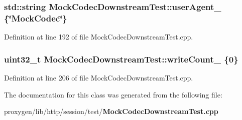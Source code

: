 \subsubsection[{user\+Agent\+\_\+}]{\setlength{\rightskip}{0pt plus 5cm}std\+::string Mock\+Codec\+Downstream\+Test\+::user\+Agent\+\_\+ \{\char`\"{}Mock\+Codec\char`\"{}\}\hspace{0.3cm}{\ttfamily [protected]}}\label{classMockCodecDownstreamTest_a39a7c662122701a53ba0e01bfd8dbeb9}


Definition at line 192 of file Mock\+Codec\+Downstream\+Test.\+cpp.

\subsubsection[{write\+Count\+\_\+}]{\setlength{\rightskip}{0pt plus 5cm}uint32\+\_\+t Mock\+Codec\+Downstream\+Test\+::write\+Count\+\_\+ \{0\}\hspace{0.3cm}{\ttfamily [protected]}}\label{classMockCodecDownstreamTest_a8e44e6698e61f758dc07dfe9f03f20d7}


Definition at line 206 of file Mock\+Codec\+Downstream\+Test.\+cpp.



The documentation for this class was generated from the following file\+:\begin{DoxyCompactItemize}
\item 
proxygen/lib/http/session/test/{\bf Mock\+Codec\+Downstream\+Test.\+cpp}\end{DoxyCompactItemize}
